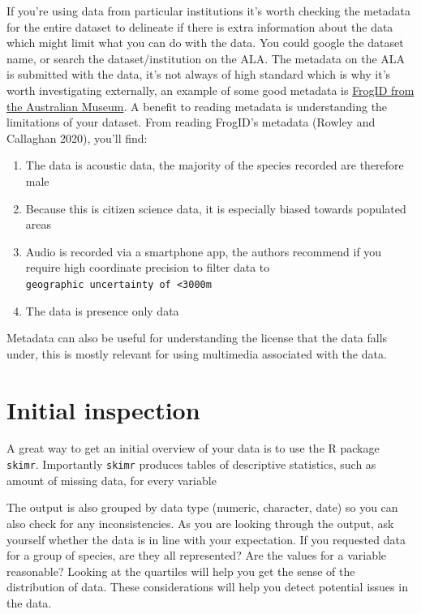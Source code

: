 \documentclass[
  letterpaper,
  DIV=11,
  numbers=noendperiod,
  oneside]{scrreprt}
\providecommand{\tightlist}{%
  \setlength{\itemsep}{0pt}\setlength{\parskip}{0pt}}\usepackage{longtable,booktabs,array}
\begin{document}
If you're using data from particular institutions it's worth checking
the metadata for the entire dataset to delineate if there is extra
information about the data which might limit what you can do with the
data. You could google the dataset name, or search the
dataset/institution on the ALA. The metadata on the ALA is submitted
with the data, it's not always of high standard which is why it's worth
investigating externally, an example of some good metadata is
\href{https://collections.ala.org.au/public/show/dr14760}{FrogID from
the Australian Museum}. A benefit to reading metadata is understanding
the limitations of your dataset. From reading FrogID's metadata (Rowley
and Callaghan 2020), you'll find:

\begin{enumerate}
\def\labelenumi{\arabic{enumi}.}
\tightlist
\item
  The data is acoustic data, the majority of the species recorded are
  therefore male
\item
  Because this is citizen science data, it is especially biased towards
  populated areas
\item
  Audio is recorded via a smartphone app, the authors recommend if you
  require high coordinate precision to filter data to
  \texttt{geographic\ uncertainty\ of\ \textless{}3000m}
\item
  The data is presence only data
\end{enumerate}

Metadata can also be useful for understanding the license that the data
falls under, this is mostly relevant for using multimedia associated
with the data.

\hypertarget{initial-inspection}{%
\section{Initial inspection}\label{initial-inspection}}

A great way to get an initial overview of your data is to use the R
package \texttt{skimr}. Importantly \texttt{skimr} produces tables of
descriptive statistics, such as amount of missing data, for every
variable

The output is also grouped by data type (numeric, character, date) so
you can also check for any inconsistencies. As you are looking through
the output, ask yourself whether the data is in line with your
expectation. If you requested data for a group of species, are they all
represented? Are the values for a variable reasonable? Looking at the
quartiles will help you get the sense of the distribution of data. These
considerations will help you detect potential issues in the data.
\end{document}
